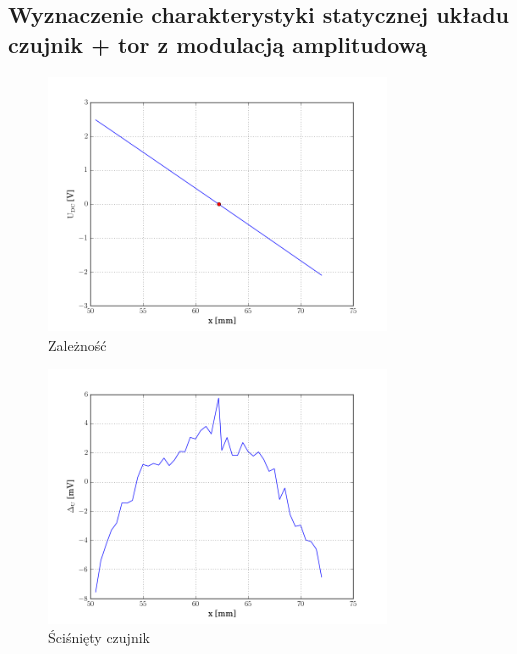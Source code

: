 \documentclass[a4paper, 12pt, titlepage]{article}
\begin{document}
		\subsection{Wyznaczenie charakterystyki statycznej układu czujnik + tor z modulacją amplitudową}
			\begin{figure}[H]
				\centering
				\includegraphics[width=0.8\textwidth]{./img/Udc_od_x.png}
				\caption{\small{Zależność }}
			\end{figure} \noindent
			\begin{figure}[H]
				\centering
				\includegraphics[width=0.8\textwidth]{./img/Udc_blad.png}
				\caption{\small{Ściśnięty czujnik}}
			\end{figure} \noindent
\end{document}

